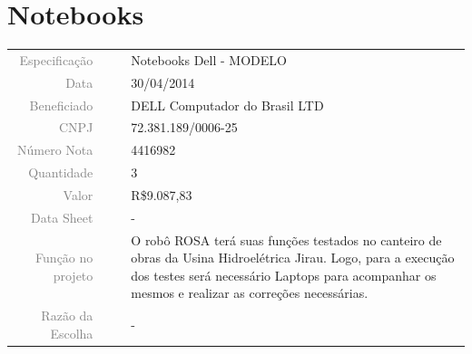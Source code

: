




\section{Notebooks}
\label{notebook}


\begin{table}[ht!]

	\begin{tabular}{r l|l p{12cm} }
		
		\textcolor{gray}{Especificação} &&& 	{Notebooks Dell - MODELO}\\
		\textcolor{gray}{Data} &&& 				{30/04/2014}\\
        \textcolor{gray}{Beneficiado} &&&		{DELL Computador do Brasil LTD} \\
        \textcolor{gray}{CNPJ} &&& 				{72.381.189/0006-25} \\
        \textcolor{gray}{Número Nota} &&& 		{4416982} \\
		\textcolor{gray}{Quantidade} &&& 		{3} \\
		\textcolor{gray}{Valor} &&& 			{R\$9.087,83} \\
		\textcolor{gray}{Data Sheet} &&& 		{-} \\

		\textcolor{gray}{Função no projeto} &&& {O robô ROSA terá suas funções testados no canteiro de obras da Usina Hidroelétrica Jirau. Logo, para a execução dos testes será necessário Laptops para acompanhar os mesmos e realizar as correções necessárias.  } \\
		\textcolor{gray}{Razão da Escolha} &&& {-}

	\end{tabular}
\end{table}

\newpage


